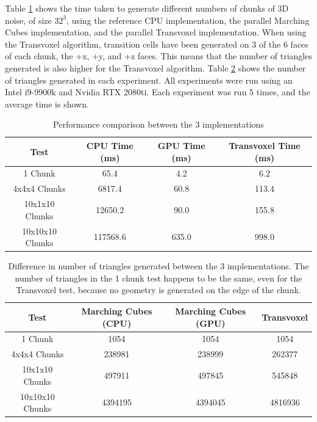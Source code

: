 \documentclass[11pt]{article}
\begin{document}
Table \ref{tab:comparison-time} shows the time taken to generate different numbers of chunks of 3D noise, of size $32^3$, using the reference CPU implementation, the parallel Marching Cubes implementation, and the parallel Transvoxel implementation. When using the Transvoxel algorithm, transition cells have been generated on 3 of the 6 faces of each chunk, the +x, +y, and +z faces. This means that the number of triangles generated is also higher for the Transvoxel algorithm. Table \ref{tab:comparison-tris} shows the number of triangles generated in each experiment. All experiments were run using an Intel i9-9900k and Nvidia RTX 2080ti. Each experiment was run 5 times, and the average time is shown.
\begin{table}[H]
  \begin{tabular}{|c|c|c|c|}
    \hline
    Test & CPU Time (ms) & GPU Time (ms) & Transvoxel Time (ms)\\
    \hline
    \hline
    1 Chunk & 65.4 & 4.2 & 6.2\\
    4x4x4 Chunks &  6817.4 & 60.8 & 113.4\\
    10x1x10 Chunks & 12650.2 & 90.0 & 155.8\\
    10x10x10 Chunks & 117568.6 & 635.0 & 998.0\\
    \hline
    
  \end{tabular}
  \caption{\label{tab:comparison-time}Performance comparison between the 3 implementations}
\end{table}


\begin{table}[H]
  \begin{tabular}{|c|c|c|c|}
    \hline
    Test & Marching Cubes (CPU) & Marching Cubes (GPU) & Transvoxel\\
    \hline
    \hline
    1 Chunk & 1054 & 1054 & 1054\\
    4x4x4 Chunks & 238981 & 238999 & 262377\\
    10x1x10 Chunks & 497911 & 497845 & 545848\\
    10x10x10 Chunks & 4394195 & 4394045 & 4816936\\
    \hline
  \end{tabular}
  \caption{\label{tab:comparison-tris}Difference in number of triangles generated between the 3 implementations. The number of triangles in the 1 chunk test happens to be the same, even for the Transvoxel test, because no geometry is generated on the edge of the chunk.}
\end{table}
\end{document}
